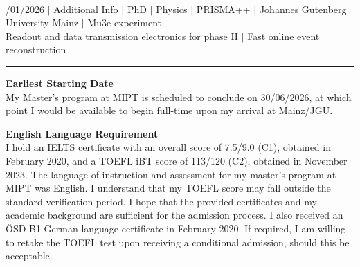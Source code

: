 \documentclass[a4paper,12pt]{article}
\begin{document}
{\centering
  {\scshape {}} \\ 
  {\fontsize{10}{10}/01/2026} $|$
  {\fontsize{10}{10}\selectfont Additional Info} $|$
  {\fontsize{10}{10}\selectfont PhD} $|$
  {\fontsize{10}{10}\selectfont Physics} $|$
  {\fontsize{10}{10}\selectfont PRISMA++} $|$
  {\fontsize{10}{10}\selectfont Johannes Gutenberg University Mainz} $|$
  {\fontsize{10}{10}\selectfont Mu3e experiment} \\
  {\fontsize{10}{10}\selectfont Readout and data transmission electronics for phase II} $|$
  {\fontsize{10}{10}\selectfont Fast online event reconstruction}
\par}
\vspace{-15pt}
\noindent\rule{\textwidth}{0.5pt}

\vspace{-10pt}

\noindent \textbf{Earliest Starting Date}\\
My Master's program at MIPT is scheduled to conclude on 30/06/2026, at which point I would be available to begin full-time upon my arrival at Mainz/JGU.

\noindent \textbf{English Language Requirement}\\
I hold an IELTS certificate with an overall score of 7.5/9.0 (C1), obtained in February 2020, and a TOEFL iBT score of 113/120 (C2), obtained in November 2023. The language of instruction and assessment for my master's program at MIPT was English. I understand that my TOEFL score may fall outside the standard verification period. I hope that the provided certificates and my academic background are sufficient for the admission process. I also received an ÖSD B1 German language certificate in February 2020. If required, I am willing to retake the TOEFL test upon receiving a conditional admission, should this be acceptable.
\end{document}
